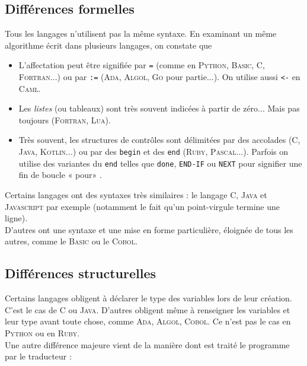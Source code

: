 \subsection{Différences formelles}

Tous les langages n'utilisent pas la même syntaxe. En examinant un même algorithme écrit dans plusieurs langages, on constate que 

\begin{itemize}
    \item   L'affectation peut être signifiée par \texttt{=} (comme en \textsc{Python}, \textsc{Basic}, \textsc{C}, \textsc{Fortran}...) ou par \texttt{:=} (\textsc{Ada}, \textsc{Algol}, \textsc{Go} pour partie...). On utilise aussi \texttt{<-} en \textsc{Caml}.
    \item   Les \textit{listes} (ou tableaux) sont très souvent indicées à partir de zéro... Mais pas toujours (\textsc{Fortran}, \textsc{Lua}).
    \item   Très souvent, les structures de contrôles sont délimitées par des accolades (\textsc{C}, \textsc{Java},  \textsc{Kotlin}...) ou par des \texttt{begin} et des \texttt{end} (\textsc{Ruby}, \textsc{Pascal}...). Parfois on utilise des variantes du \texttt{end} telles que \texttt{done}, \texttt{END-IF} ou \texttt{NEXT} pour signifier une fin de boucle « pour» .
\end{itemize}

Certains langages ont des syntaxes très similaires : le langage \textsc{C}, \textsc{Java} et \textsc{Javascript} par exemple (notamment le fait qu'un point-virgule termine une ligne).\\
D'autres ont une syntaxe et une mise en forme particulière, éloignée de tous les autres, comme le \textsc{Basic} ou le \textsc{Cobol}.

\subsection{Différences structurelles}

Certains langages obligent à déclarer le type des variables lors de leur création. C'est le cas de \textsc{C} ou \textsc{Java}. D'autres obligent même à renseigner les variables et leur type avant toute chose, comme \textsc{Ada}, \textsc{Algol}, \textsc{Cobol}. Ce n'est pas le cas en \textsc{Python} ou en \textsc{Ruby}.\\

Une autre différence majeure vient de la manière dont est traité le programme par le traducteur :

